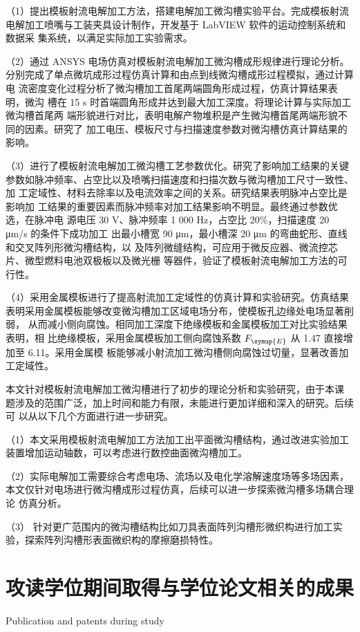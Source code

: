 \documentclass[
  type=doctor
]{../gdutthesis}
\begin{document}
（1）提出模板射流电解加工方法，搭建电解加工微沟槽实验平台。完成模板射流
电解加工喷嘴与工装夹具设计制作，开发基于 LabVIEW 软件的运动控制系统和数据采
集系统，以满足实际加工实验需求。

（2）通过 ANSYS 电场仿真对模板射流电解加工微沟槽成形规律进行理论分析。
分别完成了单点微坑成形过程仿真计算和由点到线微沟槽成形过程模拟，通过计算电
流密度变化过程分析了微沟槽加工首尾两端圆角形成过程，仿真计算结果表明，微沟
槽在 15 s 时首端圆角形成并达到最大加工深度。将理论计算与实际加工微沟槽首尾两
端形貌进行对比，表明电解产物堆积是产生微沟槽首尾两端形貌不同的因素。研究了
加工电压、模板尺寸与扫描速度参数对微沟槽仿真计算结果的影响。

（3）进行了模板射流电解加工微沟槽工艺参数优化。研究了影响加工结果的关键
参数如脉冲频率、占空比以及喷嘴扫描速度和扫描次数与微沟槽加工尺寸一致性、加
工定域性、材料去除率以及电流效率之间的关系。研究结果表明脉冲占空比是影响加
工结果的重要因素而脉冲频率对加工结果影响不明显。最终通过参数优选，在脉冲电
源电压 30 V、脉冲频率 1 000 Hz，占空比 20\%，扫描速度 20 μm/s 的条件下成功加工
出最小槽宽 90 μm，最小槽深 20 μm 的弯曲蛇形、直线和交叉阵列形微沟槽结构，以
及阵列微缝结构，可应用于微反应器、微流控芯片、微型燃料电池双极板以及微光栅
等器件，验证了模板射流电解加工方法的可行性。

（4）采用金属模板进行了提高射流加工定域性的仿真计算和实验研究。仿真结果
表明采用金属模板能够改变微沟槽加工区域电场分布，使模板孔边缘处电场显著削弱，
从而减小侧向腐蚀。相同加工深度下绝缘模板和金属模板加工对比实验结果表明，相
比绝缘模板，采用金属模板加工侧向腐蚀系数 $F_{\symup{E}}$ 从 1.47 直接增加至 6.11。采用金属模
板能够减小射流加工微沟槽侧向腐蚀过切量，显著改善加工定域性。

本文针对模板射流电解加工微沟槽进行了初步的理论分析和实验研究，由于本课
题涉及的范围广泛，加上时间和能力有限，未能进行更加详细和深入的研究。后续可
以从以下几个方面进行进一步研究。

（1）本文采用模板射流电解加工方法加工出平面微沟槽结构，通过改进实验加工
装置增加运动轴数，可以考虑进行数控曲面微沟槽加工。

（2）实际电解加工需要综合考虑电场、流场以及电化学溶解速度场等多场因素，
本文仅针对电场进行微沟槽成形过程仿真，后续可以进一步探索微沟槽多场耦合理论
仿真分析。

（3） 针对更广范围内的微沟槽结构比如刀具表面阵列沟槽形微织构进行加工实
验，探索阵列沟槽形表面微织构的摩擦磨损特性。

\chapter{攻读学位期间取得与学位论文相关的成果}{Publication and patents during study}
\end{document}
